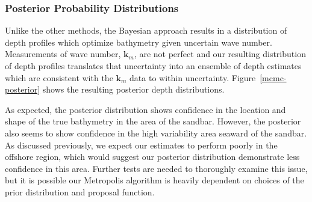 \subsubsection{Posterior Probability Distributions}


Unlike the other methods, the Bayesian approach results in a distribution of depth profiles which optimize bathymetry given uncertain wave number. Measurements of wave number, $\mathbf{k}_m$, are not perfect and our resulting distribution of depth profiles translates that uncertainty into an ensemble of depth estimates which are consistent with the $\mathbf{k}_m$ data to within uncertainty. Figure~\ref{mcmc-posterior} shows the resulting posterior depth distributions. 

As expected, the posterior distribution shows confidence in the location and shape of the true bathymetry in the area of the sandbar. However, the posterior also seems to show confidence in the high variability area seaward of the sandbar. As discussed previously, we expect our estimates to perform poorly in the offshore region, which would suggest our posterior distribution demonstrate less confidence in this area. Further tests are needed to thoroughly examine this issue, but it is possible our Metropolis algorithm is heavily dependent on choices of the prior distribution and proposal function. 


